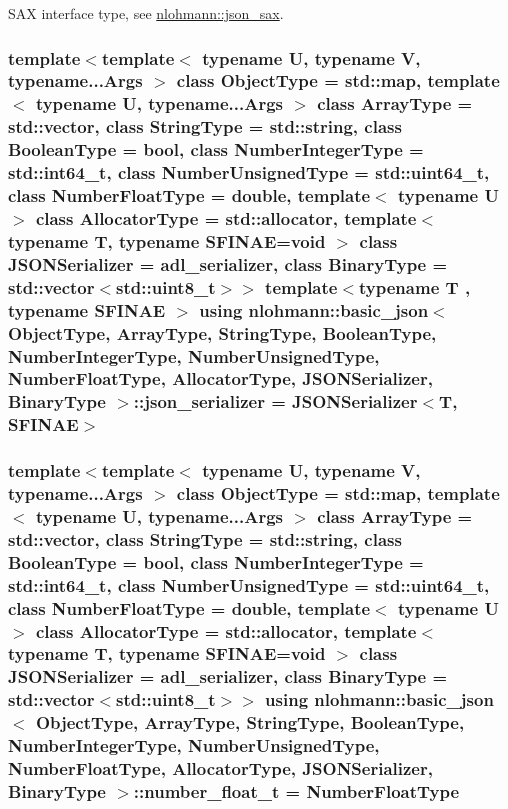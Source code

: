 S\+AX interface type, see \hyperlink{structnlohmann_1_1json__sax}{nlohmann\+::json\+\_\+sax}. 

\subsubsection[{\texorpdfstring{json\+\_\+serializer}{json_serializer}}]{\setlength{\rightskip}{0pt plus 5cm}template$<$template$<$ typename U, typename V, typename...\+Args $>$ class Object\+Type = std\+::map, template$<$ typename U, typename...\+Args $>$ class Array\+Type = std\+::vector, class String\+Type  = std\+::string, class Boolean\+Type  = bool, class Number\+Integer\+Type  = std\+::int64\+\_\+t, class Number\+Unsigned\+Type  = std\+::uint64\+\_\+t, class Number\+Float\+Type  = double, template$<$ typename U $>$ class Allocator\+Type = std\+::allocator, template$<$ typename T, typename S\+F\+I\+N\+A\+E=void $>$ class J\+S\+O\+N\+Serializer = adl\+\_\+serializer, class Binary\+Type  = std\+::vector$<$std\+::uint8\+\_\+t$>$$>$ template$<$typename T , typename S\+F\+I\+N\+AE $>$ using {\bf nlohmann\+::basic\+\_\+json}$<$ Object\+Type, Array\+Type, String\+Type, Boolean\+Type, Number\+Integer\+Type, Number\+Unsigned\+Type, Number\+Float\+Type, Allocator\+Type, J\+S\+O\+N\+Serializer, Binary\+Type $>$\+::{\bf json\+\_\+serializer} =  J\+S\+O\+N\+Serializer$<$T, S\+F\+I\+N\+AE$>$}\hypertarget{classnlohmann_1_1basic__json_ad6ebc5da7ced975bb184133750e7d49f}{}\label{classnlohmann_1_1basic__json_ad6ebc5da7ced975bb184133750e7d49f}
\subsubsection[{\texorpdfstring{number\+\_\+float\+\_\+t}{number_float_t}}]{\setlength{\rightskip}{0pt plus 5cm}template$<$template$<$ typename U, typename V, typename...\+Args $>$ class Object\+Type = std\+::map, template$<$ typename U, typename...\+Args $>$ class Array\+Type = std\+::vector, class String\+Type  = std\+::string, class Boolean\+Type  = bool, class Number\+Integer\+Type  = std\+::int64\+\_\+t, class Number\+Unsigned\+Type  = std\+::uint64\+\_\+t, class Number\+Float\+Type  = double, template$<$ typename U $>$ class Allocator\+Type = std\+::allocator, template$<$ typename T, typename S\+F\+I\+N\+A\+E=void $>$ class J\+S\+O\+N\+Serializer = adl\+\_\+serializer, class Binary\+Type  = std\+::vector$<$std\+::uint8\+\_\+t$>$$>$ using {\bf nlohmann\+::basic\+\_\+json}$<$ Object\+Type, Array\+Type, String\+Type, Boolean\+Type, Number\+Integer\+Type, Number\+Unsigned\+Type, Number\+Float\+Type, Allocator\+Type, J\+S\+O\+N\+Serializer, Binary\+Type $>$\+::{\bf number\+\_\+float\+\_\+t} =  Number\+Float\+Type}\hypertarget{classnlohmann_1_1basic__json_a5b8abaebd922d82d69756327c0c347e6}{}\label{classnlohmann_1_1basic__json_a5b8abaebd922d82d69756327c0c347e6}


